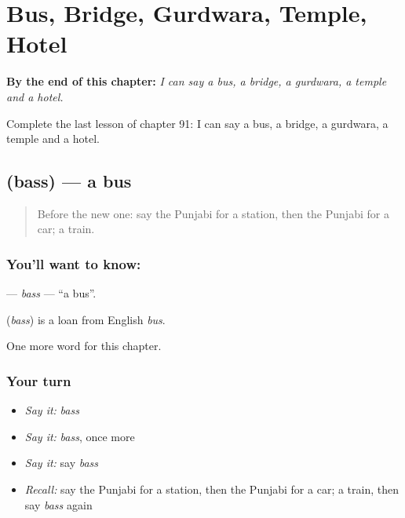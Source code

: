 
\chapter{Bus, Bridge, Gurdwara, Temple, Hotel}
\label{ch:pa-bus-bridge-gurdwara-temple-hotel}

\begin{chapteropening}
\textbf{By the end of this chapter:} \emph{I can say a bus, a bridge, a gurdwara, a temple and a hotel.}

Complete the last lesson of chapter 91: I can say a bus, a bridge, a gurdwara, a temple and a hotel.
\end{chapteropening}

\section[\texorpdfstring{\pa{ਬੱਸ} (bass)}{ਬੱਸ (bass)}]{ (bass) — a bus}

\label{lesson:PA-C91-bass}



\begin{quote}
Before the new one: say the Punjabi for a station, then the Punjabi for a car; a train.
\end{quote}

\subsection*{You'll want to know: }
\textbf{} — \emph{bass} — \textquotedblleft{}a bus\textquotedblright{}.

\begin{cousinweb}
\textbf{} (\emph{bass}) is a loan from English \emph{bus}.
\end{cousinweb}

\begin{grammarlens}[title={What you've built}]
One more word for this chapter.
\end{grammarlens}

\subsection*{Your turn}
\begin{itemize}
\raggedright
  \item \emph{Say it:} \emph{bass}
  \item \emph{Say it:} \emph{bass}, once more
  \item \emph{Say it:} say \emph{bass}
  \item \emph{Recall:} say the Punjabi for a station, then the Punjabi for a car; a train, then say \emph{bass} again
\end{itemize}

